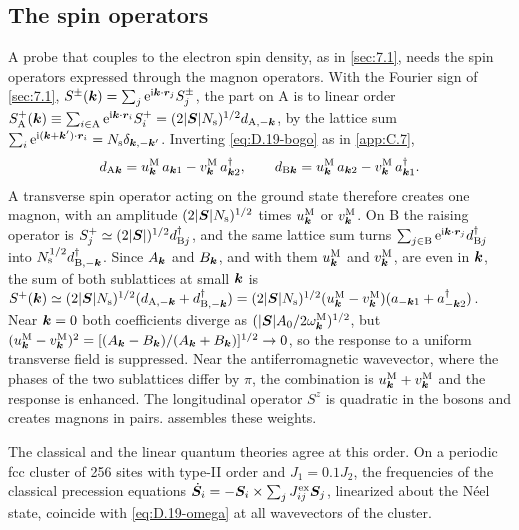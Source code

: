 \subsection*{The spin operators}

A probe that couples to the electron spin density, as in \cref{sec:7.1}, needs the spin operators expressed through the magnon operators. With the Fourier sign of \cref{sec:7.1}, $S^\pm(\bm{k}) = \sum_j\mathrm{e}^{\mathrm{i}\bm{k}\cdot\bm{r}_j}S^\pm_j$, the part on A is to linear order $S^+_{\mathrm{A}}(\bm{k}) \equiv \sum_{i\in\mathrm{A}}\mathrm{e}^{\mathrm{i}\bm{k}\cdot\bm{r}_i}S^+_i = (2|\bm{S}|N_{\mathrm{s}})^{1/2}d_{\mathrm{A},-\bm{k}}$, by the lattice sum $\sum_i\mathrm{e}^{\mathrm{i}(\bm{k}+\bm{k}')\cdot\bm{r}_i} = N_{\mathrm{s}}\delta_{\bm{k},-\bm{k}'}$. Inverting \cref{eq:D.19-bogo} as in \cref{app:C.7},
\begin{equation}
  d_{\mathrm{A}\bm{k}} = u^{\mathrm{M}}_{\bm{k}}\,a_{\bm{k}1} - v^{\mathrm{M}}_{\bm{k}}\,a^\dagger_{\bm{k}2}, \qquad
  d_{\mathrm{B}\bm{k}} = u^{\mathrm{M}}_{\bm{k}}\,a_{\bm{k}2} - v^{\mathrm{M}}_{\bm{k}}\,a^\dagger_{\bm{k}1} .
  \label{eq:D.19-inverse}
\end{equation}
A transverse spin operator acting on the ground state therefore creates one magnon, with an amplitude $(2|\bm{S}|N_{\mathrm{s}})^{1/2}$ times $u^{\mathrm{M}}_{\bm{k}}$ or $v^{\mathrm{M}}_{\bm{k}}$. On B the raising operator is $S^+_j \simeq (2|\bm{S}|)^{1/2}d^\dagger_{\mathrm{B}j}$, and the same lattice sum turns $\sum_{j\in\mathrm{B}}\mathrm{e}^{\mathrm{i}\bm{k}\cdot\bm{r}_j}d^\dagger_{\mathrm{B}j}$ into $N_{\mathrm{s}}^{1/2}d^\dagger_{\mathrm{B},-\bm{k}}$. Since $A_{\bm{k}}$ and $B_{\bm{k}}$, and with them $u^{\mathrm{M}}_{\bm{k}}$ and $v^{\mathrm{M}}_{\bm{k}}$, are even in $\bm{k}$, the sum of both sublattices at small $\bm{k}$ is $S^+(\bm{k}) \simeq (2|\bm{S}|N_{\mathrm{s}})^{1/2}(d_{\mathrm{A},-\bm{k}} + d^\dagger_{\mathrm{B},-\bm{k}}) = (2|\bm{S}|N_{\mathrm{s}})^{1/2}(u^{\mathrm{M}}_{\bm{k}} - v^{\mathrm{M}}_{\bm{k}})(a_{-\bm{k}1} + a^\dagger_{-\bm{k}2})$. Near $\bm{k} = 0$ both coefficients diverge as $(|\bm{S}|A_0/2\omega^{\mathrm{M}}_{\bm{k}})^{1/2}$, but $(u^{\mathrm{M}}_{\bm{k}} - v^{\mathrm{M}}_{\bm{k}})^2 = [(A_{\bm{k}} - B_{\bm{k}})/(A_{\bm{k}} + B_{\bm{k}})]^{1/2} \to 0$, so the response to a uniform transverse field is suppressed. Near the antiferromagnetic wavevector, where the phases of the two sublattices differ by $\pi$, the combination is $u^{\mathrm{M}}_{\bm{k}} + v^{\mathrm{M}}_{\bm{k}}$ and the response is enhanced. The longitudinal operator $S^z$ is quadratic in the bosons and creates magnons in pairs.  assembles these weights.

The classical and the linear quantum theories agree at this order. On a periodic fcc cluster of 256 sites with type-II order and $J_1 = 0.1J_2$, the frequencies of the classical precession equations $\dot{\bm{S}}_i = -\bm{S}_i\times\sum_jJ^{\mathrm{ex}}_{ij}\bm{S}_j$, linearized about the Néel state, coincide with \cref{eq:D.19-omega} at all wavevectors of the cluster.
